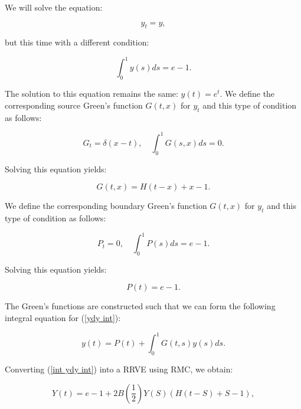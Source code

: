 \documentclass[a4paper,12pt]{article}
\begin{document}
\begin{example}[$y_t=y$ average condition]
    We will solve the equation:

    \begin{equation} \label{ydy int}
        y_t = y,
    \end{equation}

    but this time with a different condition:

    \begin{equation}
        \int_{0}^{1} y(s) ds = e-1.
    \end{equation}

    The solution to this equation remains the same: $y(t) = e^{t}$.
    We define the corresponding source Green's function $G(t,x)$ for $y_t$
    and this type of condition as follows:

    \begin{equation}
        G_t = \delta(x-t), \quad \int_{0}^{1} G(s,x) ds = 0.
    \end{equation}

    Solving this equation yields:

    \begin{equation}
        G(t,x) = H(t-x) + x - 1.
    \end{equation}

    We define the corresponding boundary Green's function $G(t,x)$ for $y_t$
    and this type of condition as follows:

    \begin{equation}
        P_{t} = 0, \quad \int_{0}^{1} P(s) ds = e -1.
    \end{equation}

    Solving this equation yields:

    \begin{equation}
        P(t) = e -1.
    \end{equation}

    The Green's functions are constructed such that
    we can form the following integral equation for (\ref{ydy int}):

    \begin{equation} \label{int ydy int}
        y(t) = P(t) + \int_{0}^{1} G(t,s) y(s) ds.
    \end{equation}

    Converting (\ref{int ydy int}) into a RRVE
    using RMC, we obtain:

    \begin{equation}\label{RRVE ydy int}
        Y(t) = e - 1 + 2B\left(\frac{1}{2}\right)Y(S)(H(t-S)+S-1),
    \end{equation}


\end{example}
\end{document}
